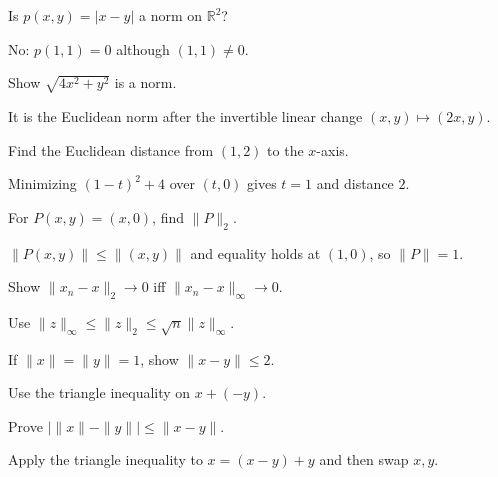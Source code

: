 \begin{problem}\label{prob:ii02-problem-02}
Is $p(x,y)=|x-y|$ a norm on $\mathbb R^2$?
\end{problem}
\begin{solution}
No: $p(1,1)=0$ although $(1,1)\ne0$.
\end{solution}

\begin{problem}\label{prob:ii02-problem-03}
Show $\sqrt{4x^2+y^2}$ is a norm.
\end{problem}
\begin{solution}
It is the Euclidean norm after the invertible linear change $(x,y)\mapsto(2x,y)$.
\end{solution}

\begin{problem}\label{prob:ii02-problem-04}
Find the Euclidean distance from $(1,2)$ to the $x$-axis.
\end{problem}
\begin{solution}
Minimizing $(1-t)^2+4$ over $(t,0)$ gives $t=1$ and distance $2$.
\end{solution}

\begin{problem}\label{prob:ii02-problem-05}
For $P(x,y)=(x,0)$, find $\|P\|_2$.
\end{problem}
\begin{solution}
$\|P(x,y)\|\le\|(x,y)\|$ and equality holds at $(1,0)$, so $\|P\|=1$.
\end{solution}

\begin{problem}\label{prob:ii02-problem-06}
Show $\|x_n-x\|_2\to0$ iff $\|x_n-x\|_\infty\to0$.
\end{problem}
\begin{solution}
Use $\|z\|_\infty\le\|z\|_2\le\sqrt n\|z\|_\infty$.
\end{solution}

\begin{problem}\label{prob:ii02-problem-07}
If $\|x\|=\|y\|=1$, show $\|x-y\|\le2$.
\end{problem}
\begin{solution}
Use the triangle inequality on $x+(-y)$.
\end{solution}

\begin{problem}\label{prob:ii02-problem-08}
Prove $|\|x\|-\|y\||\le\|x-y\|$.
\end{problem}
\begin{solution}
Apply the triangle inequality to $x=(x-y)+y$ and then swap $x,y$.
\end{solution}

